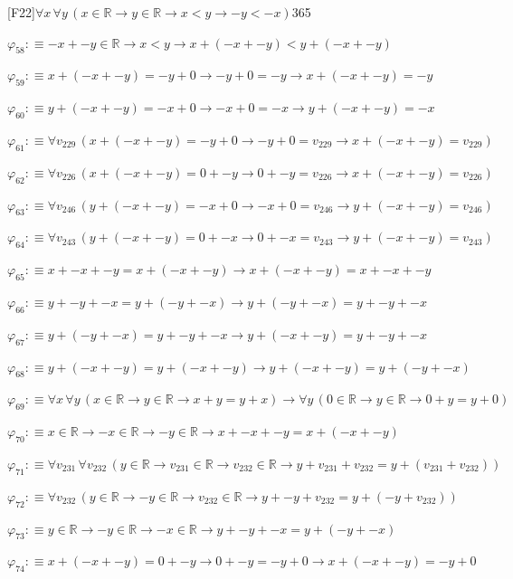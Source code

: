 \begin{fullproof}{[F22]}{$\forall x\,\forall y\,(x \in \mathbb{R} \to y \in \mathbb{R} \to x < y \to -y < -x)$}{365}
\begin{abbrevlist}
\item $\varphi_{58} :\equiv -x + -y \in \mathbb{R} \to x < y \to x + (-x + -y) < y + (-x + -y)$
\item $\varphi_{59} :\equiv x + (-x + -y) = -y + 0 \to -y + 0 = -y \to x + (-x + -y) = -y$
\item $\varphi_{60} :\equiv y + (-x + -y) = -x + 0 \to -x + 0 = -x \to y + (-x + -y) = -x$
\item $\varphi_{61} :\equiv \forall v_{229}\,(x + (-x + -y) = -y + 0 \to -y + 0 = v_{229} \to x + (-x + -y) = v_{229})$
\item $\varphi_{62} :\equiv \forall v_{226}\,(x + (-x + -y) = 0 + -y \to 0 + -y = v_{226} \to x + (-x + -y) = v_{226})$
\item $\varphi_{63} :\equiv \forall v_{246}\,(y + (-x + -y) = -x + 0 \to -x + 0 = v_{246} \to y + (-x + -y) = v_{246})$
\item $\varphi_{64} :\equiv \forall v_{243}\,(y + (-x + -y) = 0 + -x \to 0 + -x = v_{243} \to y + (-x + -y) = v_{243})$
\item $\varphi_{65} :\equiv x + -x + -y = x + (-x + -y) \to x + (-x + -y) = x + -x + -y$
\item $\varphi_{66} :\equiv y + -y + -x = y + (-y + -x) \to y + (-y + -x) = y + -y + -x$
\item $\varphi_{67} :\equiv y + (-y + -x) = y + -y + -x \to y + (-x + -y) = y + -y + -x$
\item $\varphi_{68} :\equiv y + (-x + -y) = y + (-x + -y) \to y + (-x + -y) = y + (-y + -x)$
\item $\varphi_{69} :\equiv \forall x\,\forall y\,(x \in \mathbb{R} \to y \in \mathbb{R} \to x + y = y + x) \to \forall y\,(0 \in \mathbb{R} \to y \in \mathbb{R} \to 0 + y = y + 0)$
\item $\varphi_{70} :\equiv x \in \mathbb{R} \to -x \in \mathbb{R} \to -y \in \mathbb{R} \to x + -x + -y = x + (-x + -y)$
\item $\varphi_{71} :\equiv \forall v_{231}\,\forall v_{232}\,(y \in \mathbb{R} \to v_{231} \in \mathbb{R} \to v_{232} \in \mathbb{R} \to y + v_{231} + v_{232} = y + (v_{231} + v_{232}))$
\item $\varphi_{72} :\equiv \forall v_{232}\,(y \in \mathbb{R} \to -y \in \mathbb{R} \to v_{232} \in \mathbb{R} \to y + -y + v_{232} = y + (-y + v_{232}))$
\item $\varphi_{73} :\equiv y \in \mathbb{R} \to -y \in \mathbb{R} \to -x \in \mathbb{R} \to y + -y + -x = y + (-y + -x)$
\item $\varphi_{74} :\equiv x + (-x + -y) = 0 + -y \to 0 + -y = -y + 0 \to x + (-x + -y) = -y + 0$

\end{abbrevlist}
\end{fullproof}
